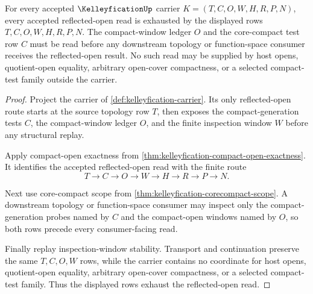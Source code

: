 \begin{theorem}
\label{thm:kelleyfication-compact-window-exhaustion}
For every accepted $\KelleyficationUp$ carrier $K=(T,C,O,W,H,R,P,N)$, every accepted reflected-open read is exhausted by the displayed rows $T,C,O,W,H,R,P,N$. The compact-window ledger $O$ and the core-compact test row $C$ must be read before any downstream topology or function-space consumer receives the reflected-open result. No such read may be supplied by host opens, quotient-open equality, arbitrary open-cover compactness, or a selected compact-test family outside the carrier.
\end{theorem}
\begin{proof}
Project the carrier of \autoref{def:kelleyfication-carrier}. Its only reflected-open route starts at the source topology row $T$, then exposes the compact-generation tests $C$, the compact-window ledger $O$, and the finite inspection window $W$ before any structural replay.

Apply compact-open exactness from \autoref{thm:kelleyfication-compact-open-exactness}. It identifies the accepted reflected-open read with the finite route
$$
T \to C \to O \to W \to H \to R \to P \to N.
$$

Next use core-compact scope from \autoref{thm:kelleyfication-corecompact-scope}. A downstream topology or function-space consumer may inspect only the compact-generation probes named by $C$ and the compact-open windows named by $O$, so both rows precede every consumer-facing read.

Finally replay inspection-window stability. Transport and continuation preserve the same $T,C,O,W$ rows, while the carrier contains no coordinate for host opens, quotient-open equality, arbitrary open-cover compactness, or a selected compact-test family. Thus the displayed rows exhaust the reflected-open read.
\end{proof}

